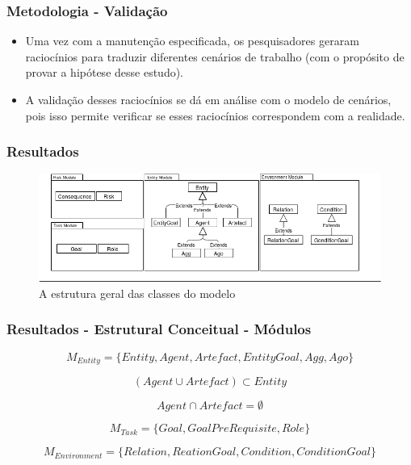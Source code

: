 \documentclass{beamer}
\begin{document}
\begin{frame}
	\frametitle{Metodologia - Validação}
	\begin{itemize}
		\item Uma vez com a manutenção especificada, os pesquisadores geraram raciocínios para traduzir diferentes cenários de trabalho (com o propósito de provar a hipótese desse estudo). 
		\item A validação desses raciocínios se dá em análise com o modelo de cenários, pois isso permite verificar se esses raciocínios correspondem com a realidade. 
	\end{itemize} 
\end{frame}

\begin{frame}
	\frametitle{Resultados}
	\begin{figure}[H]
	  \centering
	  \includegraphics[width=1\linewidth]{figure/Module.png} 
	  \caption{A estrutura geral das classes do modelo}
	  \label{module}
	\end{figure} 
\end{frame}

\begin{frame}
	\frametitle{Resultados - Estrutural Conceitual - Módulos}
 	\begin{equation} 
		M_{Entity} = \{ Entity, Agent, Artefact, EntityGoal, Agg, Ago\}
	\end{equation}\label{modent}

	\begin{equation} \label{defineentity} 
		( Agent \cup Artefact ) \subset Entity
	\end{equation}

	\begin{equation} \label{agentsartefactvoid}
    	Agent \cap Artefact = \emptyset
	\end{equation}

	\begin{equation}
    	M_{Task} = \{ Goal, GoalPreRequisite, Role \}
	\end{equation}

	\begin{equation}
	    M_{Environment} = \{ Relation, ReationGoal, Condition, ConditionGoal \}
	\end{equation}

\end{frame}
\end{document}
